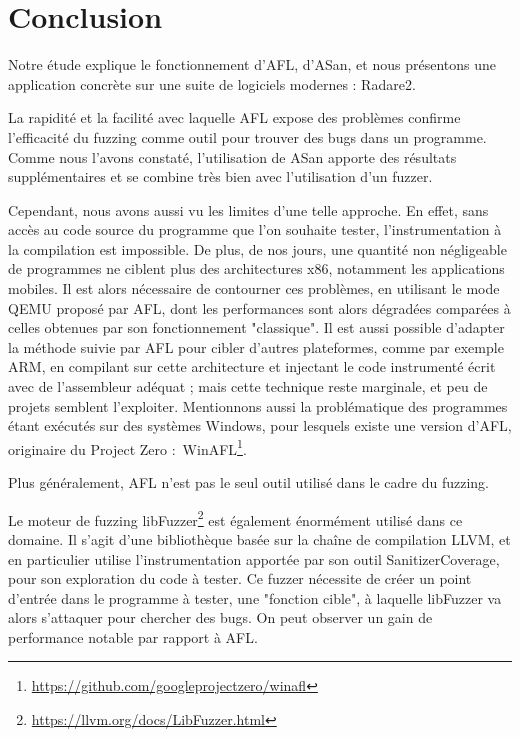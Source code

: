 \chapter*{Conclusion}

Notre étude explique le fonctionnement d'AFL, d'ASan, et nous présentons une
application concrète sur une suite de logiciels modernes : Radare2.

La rapidité et la facilité avec laquelle AFL expose des problèmes confirme
l'efficacité du fuzzing comme outil pour trouver des bugs dans un programme.
Comme nous l'avons constaté, l'utilisation de ASan apporte des résultats
supplémentaires et se combine très bien avec l'utilisation d'un fuzzer.

Cependant, nous avons aussi vu les limites d'une telle approche.
En effet, sans accès au code source du programme que l'on souhaite tester, l'instrumentation à la compilation est impossible.
De plus, de nos jours, une quantité non négligeable de programmes ne ciblent plus des architectures x86, notamment les applications mobiles.
Il est alors nécessaire de contourner ces problèmes, en utilisant le mode QEMU proposé par AFL, dont les performances sont alors dégradées comparées à celles obtenues par son fonctionnement "classique".
Il est aussi possible d'adapter la méthode suivie par AFL pour cibler d'autres plateformes, comme par exemple ARM, en compilant sur cette architecture et injectant le code instrumenté écrit avec de l'assembleur adéquat ; mais cette technique reste marginale, et peu de projets semblent l'exploiter.
Mentionnons aussi la problématique des programmes étant exécutés sur des systèmes Windows, pour lesquels existe une version d'AFL, originaire du Project Zero : WinAFL\footnote{\url{https://github.com/googleprojectzero/winafl}}.

Plus généralement, AFL n'est pas le seul outil utilisé dans le cadre du fuzzing.

Le moteur de fuzzing libFuzzer\footnote{\url{https://llvm.org/docs/LibFuzzer.html}}
est également énormément utilisé dans ce domaine.
Il s'agit d'une bibliothèque basée sur la chaîne de compilation LLVM, et en
particulier utilise l'instrumentation apportée par son outil SanitizerCoverage,
pour son exploration du code à tester.
Ce fuzzer nécessite de créer un point d'entrée dans le programme à tester, une
"fonction cible", à laquelle libFuzzer va alors s'attaquer pour chercher des bugs.
On peut observer un gain de performance notable par rapport à AFL.

